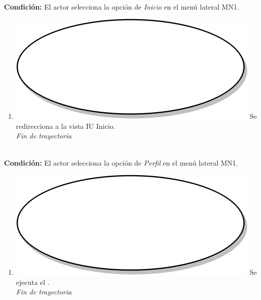\textbf{} \\
\textbf{Condición:} El actor selecciona la opción de \textit{Inicio} en el menú lateral MN1. \\
 \begin{enumerate}[label=L\arabic*]
    \item {\includegraphics[scale=.05]{Capitulo3/img/proceso.png} Se redirecciona a la vista IU Inicio.} \\
    \textit{Fin de trayectoria} \\
\end{enumerate}

\textbf{} \\
\textbf{Condición:} El actor selecciona la opción de \textit{Perfil} en el menú lateral MN1. \\
 \begin{enumerate}[label=M\arabic*]
    \item {\includegraphics[scale=.05]{Capitulo3/img/proceso.png} Se ejecuta el \textbf{}.} \\
    \textit{Fin de trayectoria} \\
\end{enumerate}

